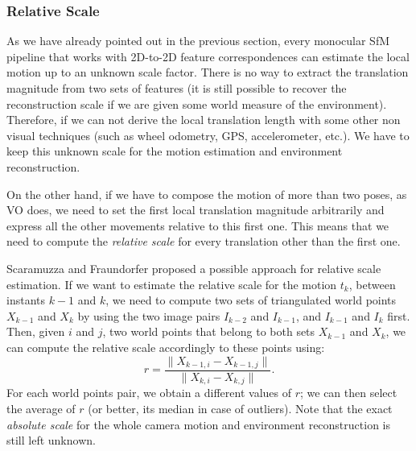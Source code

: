 \subsubsection{Relative Scale}
As we have already pointed out in the previous section, every monocular SfM 
pipeline that works with 2D-to-2D feature correspondences can estimate the 
local motion up to an unknown scale factor. There is no way to extract 
the translation magnitude from two sets of features (it is still possible 
to recover the reconstruction scale if we are given some world measure of the
environment).
Therefore, if we can not derive the local translation length with some other
non visual techniques (such as wheel odometry, GPS, accelerometer, etc.).
We have to keep this unknown scale for the motion estimation and 
environment reconstruction.

On the other hand, if we have to compose the motion of more than two poses, 
as VO does, we need to set the first local translation magnitude 
arbitrarily and express all the other movements relative to this first one.
This means that we need to compute the \textit{relative scale}
for every translation other than the first one.

Scaramuzza and Fraundorfer\cite{scaramuzzaVisualOdometryI} proposed a possible approach for relative scale estimation. If we want to estimate the relative scale for 
the motion $t_k$, between instants $k-1$ and $k$, we need to compute 
two sets of triangulated world points $X_{k-1}$ and $X_{k}$ by using 
the two image pairs $I_{k-2}$ and $I_{k-1}$, and $I_{k-1}$ and $I_{k}$ first. 
Then, given $i$ and $j$, two world points that belong to both sets $X_{k-1}$ and 
$X_{k}$, we can compute the relative scale accordingly to these points using:
%
\begin{equation}
	\label{eq:relative_scale}
	r = \frac{\| X_{k-1, i} - X_{k - 1, j} \|}{\| X_{k, i} - X_{k, j} \|}
	\text{.}
\end{equation}
%
\noindent For each world points pair, we obtain a different values of $r$;
we can then select the average of $r$ (or better, its median in case of 
outliers).
%
Note that the exact \textit{absolute scale} for the whole 
camera motion and environment reconstruction is still left unknown.

